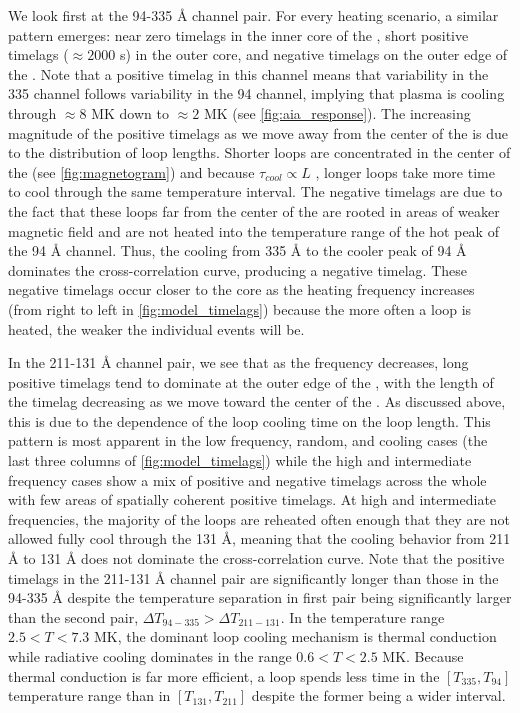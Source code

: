 We look first at the 94-335 \AA{} channel pair. For every heating scenario, a similar pattern emerges: near zero timelags in the inner core of the \AR{}, short positive timelags ($\approx2000$ s) in the outer core, and negative timelags on the outer edge of the \AR{}. Note that a positive timelag in this channel means that variability in the 335 channel follows variability in the 94 channel, implying that plasma is cooling through $\approx8$ MK down to $\approx2$ MK (see \autoref{fig:aia_response}). The increasing magnitude of the positive timelags as we move away from the center of the \AR{} is due to the distribution of loop lengths. Shorter loops are concentrated in the center of the \AR{} (see \autoref{fig:magnetogram}) and because $\tau_{cool}\propto L$ \citep[see Appendix of][]{cargill_active_2014}, longer loops take more time to cool through the same temperature interval. The negative timelags are due to the fact that these loops far from the center of the \AR{} are rooted in areas of weaker magnetic field and are not heated into the temperature range of the hot peak of the 94 \AA{} channel. Thus, the cooling from 335 \AA{} to the cooler peak of 94 \AA{} dominates the cross-correlation curve, producing a negative timelag. These negative timelags occur closer to the core as the heating frequency increases (from right to left in \autoref{fig:model_timelags}) because the more often a loop is heated, the weaker the individual events will be. 

In the 211-131 \AA{} channel pair, we see that as the frequency decreases, long positive timelags tend to dominate at the outer edge of the \AR{}, with the length of the timelag decreasing as we move toward the center of the \AR{}. As discussed above, this is due to the dependence of the loop cooling time on the loop length. This pattern is most apparent in the low frequency, random, and cooling cases (the last three columns of \autoref{fig:model_timelags}) while the high and intermediate frequency cases show a mix of positive and negative timelags across the whole \AR{} with few areas of spatially coherent positive timelags. At high and intermediate frequencies, the majority of the loops are reheated often enough that they are not allowed fully cool through the 131 \AA{}, meaning that the cooling behavior from 211 \AA{} to 131 \AA{} does not dominate the cross-correlation curve. Note that the positive timelags in the 211-131 \AA{} channel pair are significantly longer than those in the 94-335 \AA{} despite the temperature separation in first pair being significantly larger than the second pair, $\Delta T_{94-335}>\Delta T_{211-131}$. In the temperature range $2.5<T<7.3$ MK, the dominant loop cooling mechanism is thermal conduction while radiative cooling dominates in the range $0.6<T<2.5$ MK. Because thermal conduction is far more efficient, a loop spends less time in the $[T_{335},T_{94}]$ temperature range than in $[T_{131},T_{211}]$ despite the former being a wider interval.

